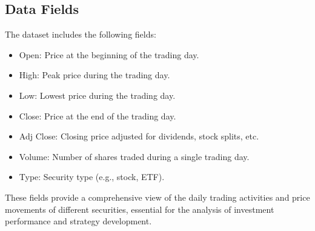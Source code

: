 \subsection{Data Fields}
The dataset includes the following fields:
\begin{itemize}
    \item Open: Price at the beginning of the trading day.
    \item High: Peak price during the trading day.
    \item Low: Lowest price during the trading day.
    \item Close: Price at the end of the trading day.
    \item Adj Close: Closing price adjusted for dividends, stock splits, etc.
    \item Volume: Number of shares traded during a single trading day.
    \item Type: Security type (e.g., stock, ETF).
\end{itemize}

These fields provide a comprehensive view of the daily trading activities and price movements of different securities, essential for the analysis of investment performance and strategy development.

\newpage
